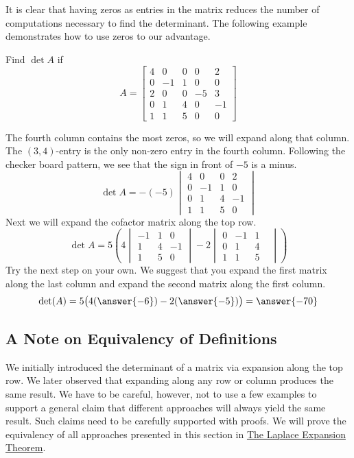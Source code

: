 \documentclass{ximera}
\begin{document}
It is clear that having zeros as entries in the matrix reduces the number of computations necessary to find the determinant.  The following example demonstrates how to use zeros to our advantage.

\begin{example}\label{ex:laplace2}
Find $\det{A}$ if
$$A=\begin{bmatrix}4&0&0&0&2\\0&-1&1&0&0\\2&0&0&-5&3\\0&1&4&0&-1\\1&1&5&0&0\end{bmatrix}$$

\begin{explanation}
The fourth column contains the most zeros, so we will expand along that column.  The  $(3, 4)$-entry is the only non-zero entry in the fourth column.  Following the checker board pattern, we see that the sign in front of $-5$ is a minus.  
$$\det{A}=-(-5)\begin{vmatrix}4&0&0&2\\0&-1&1&0\\0&1&4&-1\\1&1&5&0\end{vmatrix}
$$
Next we will expand the cofactor matrix along the top row.
$$\det{A}=5\left(4\begin{vmatrix}-1&1&0\\1&4&-1\\1&5&0\end{vmatrix}-2\begin{vmatrix}0&-1&1\\0&1&4&\\1&1&5\end{vmatrix}\right)$$
Try the next step on your own.  We suggest that you expand the first matrix along the last column and expand the second matrix along the first column.
$$\det(A)=5\big(4(\answer{-6})-2(\answer{-5})\big)=\answer{-70}$$
\end{explanation}
\end{example}

\subsection*{A Note on Equivalency of Definitions}
We initially introduced the determinant of a matrix via expansion along the top row.  We later observed that expanding along any row or column produces the same result.  We have to be careful, however, not to use a few examples to support a general claim that different approaches will always yield the same result.  Such claims need to be carefully supported with proofs.  We will prove the equivalency of all approaches presented in this section in \href{https://ximera.osu.edu/oerlinalg/LinearAlgebra/DET-0050/main}{The Laplace Expansion Theorem}.
\end{document}
